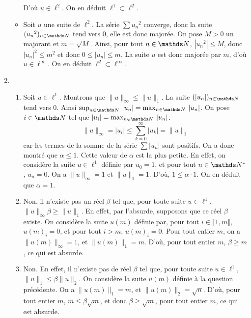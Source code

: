 \documentclass[a4paper]{article}
\begin{document}
\begin{enumerate}
\begin{itemize}
					D'où $u \in \ell^2$.
					On en déduit $\ell^1 \subset \ell^2$.
				\item Soit $u$ une suite de $\ell^2$. La série $\sum u_n{}^2$ converge, donc la suite $(u_n{}^2)_{n \in \N}$ tend vers 0, elle est donc majorée. On pose $M > 0$ un majorant et $m = \sqrt{M}$. Ainsi, pour tout $n \in \N$, $|u_n{}^2| \le M$, donc $|u_n|^2 \le m^2$ et donc $0 \le |u_n| \le m$.
					La suite $u$ est donc majorée par $m$, d'où $u \in \ell^\infty$.
					On en déduit $\ell^2 \subset \ell^\infty$.
			\end{itemize}
		\item 
			\begin{enumerate}
				\item Soit $u \in \ell^1$. Montrons que $\|u\|_\infty \le \|u\|_1$.
					La suite $(|u_n|)_{n\in\N}$ tend vers 0.
					Ainsi $\sup_{n \in \N}\: |u_n| = \max_{n \in \N}\: |u_n|$.
					On pose $i \in \N$ tel que $|u_i| = \max_{n \in \N}\: |u_n|$.
					\[
						\|u\|_\infty = |u_i| \le \sum_{k=0}^\infty |u_k| = \|u\|_1
					\] car les termes de la somme de la série $\sum |u_n|$ sont positifs.
					On a donc montré que $\alpha \le 1$.
					Cette valeur de $\alpha$ est la plus petite. En effet, on considère la suite $u \in \ell^1$ définie par $u_0 = 1$, et pour tout $n \in \N^*$, $u_n = 0$. On a $\|u\|_\infty = 1$ et $\|u\|_1 = 1$. D'où, $1 \le \alpha \cdot  1$.
					On en déduit que $\alpha = 1$.
				\item Non, il n'existe pas un réel $\beta$ tel que, pour toute suite $u \in \ell^1$, $\|u\|_\infty \beta\ge \|u\|_1$.
					En effet, par l'absurde, supposons que ce réel $\beta$ existe.
					On considère la suite $u(m)$ définie par, pour tout $i \in \llbracket 1,m \rrbracket$, $u(m)_i = 0$, et pour tout $i > m$, $u(m)_i = 0$.
					Pour tout entier $m$, on a $\|u(m)\|_\infty = 1$, et $\|u(m)\|_1 = m$.
					D'où, pour tout entier $m$, $\beta \ge m$, ce qui est absurde.
				\item Non. En effet, il n'existe pas de réel $\beta$ tel que, pour toute suite $u \in \ell^1$, $\|u\|_1 \le \beta \|u\|_2$.
					On considère la suite $u(m)$ définie à la question précédente.
					On a $\|u(m)\|_1 = m$, et $\|u(m)\|_2 = \sqrt{n}$. D'où, pour tout entier $m$, $m \le \beta \sqrt{m}$, et donc $\beta \ge \sqrt{m}$, pour tout entier $m$, ce qui est absurde.
			\end{enumerate}
	\end{enumerate}
\end{document}
